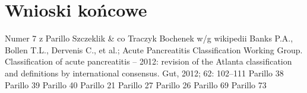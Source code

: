 \documentclass[a4paper, 12pt]{report}
\begin{document}
\chapter{Wnioski końcowe}

\begin{thebibliography}{99}
 Numer 7 z Parillo
 Szczeklik \& co
 Traczyk
 Bochenek w/g wikipedii
 Banks P.A., Bollen T.L., Dervenis C., et al.; Acute
  Pancreatitis Classification Working Group. Classification of acute
  pancreatitis – 2012: revision of the Atlanta classification and
  definitions by international consensus. Gut, 2012; 62: 102–111
 Parillo 38
 Parillo 39
 Parillo 40
 Parillo 21
 Parillo 27
 Parillo 26
 Parillo 69
 Parillo 73
\end{thebibliography}
\end{document}
